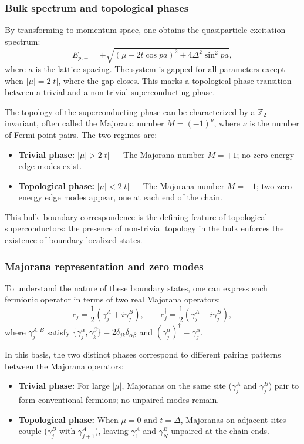 \documentclass[11pt, letterpaper, titlepage]{article}
\begin{document}
\subsubsection{Bulk spectrum and topological phases}

By transforming to momentum space, one obtains the quasiparticle excitation spectrum:
\begin{equation}
E_{p,\pm} = \pm \sqrt{(\mu - 2t \cos{pa})^2 + 4\Delta^2 \sin^2{pa}},
\end{equation}
where $a$ is the lattice spacing. The system is gapped for all parameters except when $|\mu| = 2|t|$, where the gap closes. This marks a topological phase transition between a trivial and a non-trivial superconducting phase.

The topology of the superconducting phase can be characterized by a $\mathbb{Z}_2$ invariant, often called the Majorana number $M = (-1)^\nu$, where $\nu$ is the number of Fermi point pairs. The two regimes are:
\begin{itemize}
    \item \textbf{Trivial phase:} $|\mu| > 2|t|$ — The Majorana number $M=+1$; no zero-energy edge modes exist.
    \item \textbf{Topological phase:} $|\mu| < 2|t|$ — The Majorana number $M=-1$; two zero-energy edge modes appear, one at each end of the chain.
\end{itemize}
This bulk–boundary correspondence is the defining feature of topological superconductors: the presence of non-trivial topology in the bulk enforces the existence of boundary-localized states.

\subsubsection{Majorana representation and zero modes}

To understand the nature of these boundary states, one can express each fermionic operator in terms of two real Majorana operators:
\begin{equation}
c_j = \frac{1}{2}(\gamma_j^A + i\gamma_j^B), \qquad
c_j^\dagger = \frac{1}{2}(\gamma_j^A - i\gamma_j^B),
\end{equation}
where $\gamma_j^{A,B}$ satisfy $\{\gamma_j^\alpha, \gamma_k^\beta\} = 2\delta_{jk}\delta_{\alpha\beta}$ and $(\gamma_j^\alpha)^\dagger = \gamma_j^\alpha$.

In this basis, the two distinct phases correspond to different pairing patterns between the Majorana operators:
\begin{itemize}
    \item \textbf{Trivial phase:} For large $|\mu|$, Majoranas on the same site ($\gamma_j^A$ and $\gamma_j^B$) pair to form conventional fermions; no unpaired modes remain.
    \item \textbf{Topological phase:} When $\mu=0$ and $t=\Delta$, Majoranas on adjacent sites couple ($\gamma_j^B$ with $\gamma_{j+1}^A$), leaving $\gamma_1^A$ and $\gamma_N^B$ unpaired at the chain ends.
\end{itemize}
\end{document}
